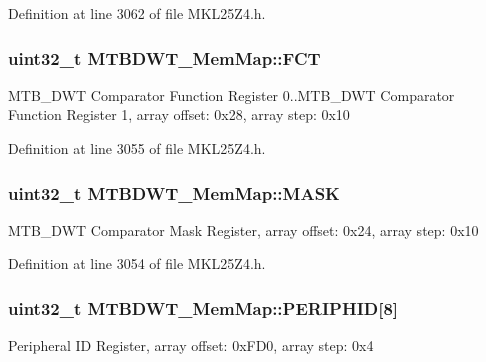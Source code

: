Definition at line 3062 of file M\+K\+L25\+Z4.\+h.

\subsubsection[{\texorpdfstring{F\+CT}{FCT}}]{\setlength{\rightskip}{0pt plus 5cm}uint32\+\_\+t M\+T\+B\+D\+W\+T\+\_\+\+Mem\+Map\+::\+F\+CT}\hypertarget{struct_m_t_b_d_w_t___mem_map_a245357bec738a4b4efe972976710ee58}{}\label{struct_m_t_b_d_w_t___mem_map_a245357bec738a4b4efe972976710ee58}
M\+T\+B\+\_\+\+D\+WT Comparator Function Register 0..M\+T\+B\+\_\+\+D\+WT Comparator Function Register 1, array offset\+: 0x28, array step\+: 0x10 

Definition at line 3055 of file M\+K\+L25\+Z4.\+h.

\subsubsection[{\texorpdfstring{M\+A\+SK}{MASK}}]{\setlength{\rightskip}{0pt plus 5cm}uint32\+\_\+t M\+T\+B\+D\+W\+T\+\_\+\+Mem\+Map\+::\+M\+A\+SK}\hypertarget{struct_m_t_b_d_w_t___mem_map_aaef890e895e809c3197697b5f53eaf43}{}\label{struct_m_t_b_d_w_t___mem_map_aaef890e895e809c3197697b5f53eaf43}
M\+T\+B\+\_\+\+D\+WT Comparator Mask Register, array offset\+: 0x24, array step\+: 0x10 

Definition at line 3054 of file M\+K\+L25\+Z4.\+h.

\subsubsection[{\texorpdfstring{P\+E\+R\+I\+P\+H\+ID}{PERIPHID}}]{\setlength{\rightskip}{0pt plus 5cm}uint32\+\_\+t M\+T\+B\+D\+W\+T\+\_\+\+Mem\+Map\+::\+P\+E\+R\+I\+P\+H\+ID\mbox{[}8\mbox{]}}\hypertarget{struct_m_t_b_d_w_t___mem_map_a59a2401dc9511e3c87fcc5c2a9867f49}{}\label{struct_m_t_b_d_w_t___mem_map_a59a2401dc9511e3c87fcc5c2a9867f49}
Peripheral ID Register, array offset\+: 0x\+F\+D0, array step\+: 0x4 

